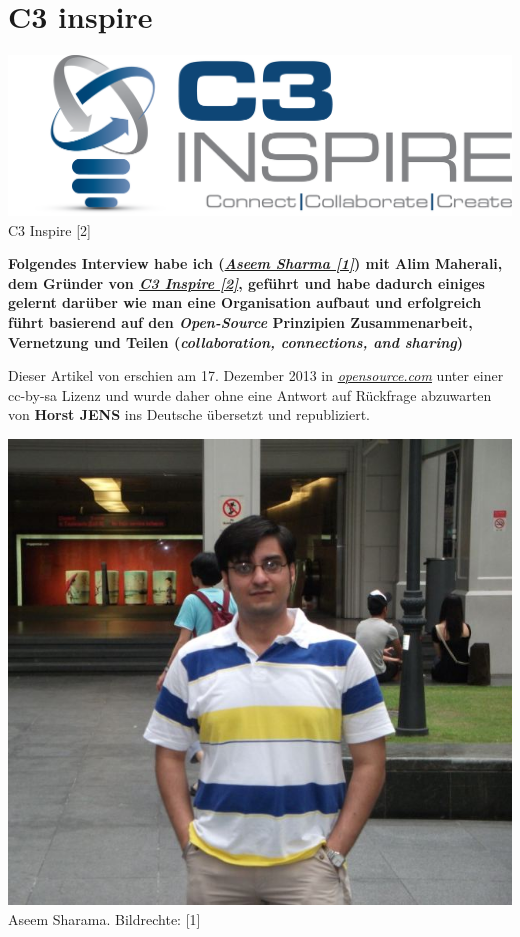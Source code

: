 \section*{C3 inspire}
\hypertarget{c3inspire}{}
\label{c3inspire}
\begin{center}
\includegraphics[width=0.8\linewidth]{c3inspire/c3inspire.png}\\
\footnotesize{C3 Inspire [2]}
\end{center}

\textbf{Folgendes Interview habe ich (\href{http://aseemsharma.info/about-me/aseemsharma/}{\textit{Aseem Sharma [1]}}) mit Alim Maherali, dem Gründer von \href{http://c3inspire.com}{\textit{C3 Inspire [2]}}, geführt und habe dadurch einiges gelernt darüber wie man eine Organisation aufbaut und erfolgreich führt basierend auf den \textit{Open-Source} Prinzipien Zusammenarbeit, Vernetzung und Teilen (\textit{collaboration, connections, and sharing})}

Dieser Artikel von  erschien am 17. Dezember 2013 in \href{http://opensource.com/education/13/12/interview-Alim-Maherali-C3-Inspire}{\textit{opensource.com}} unter einer cc-by-sa Lizenz und wurde daher ohne eine Antwort auf Rückfrage abzuwarten von  \textbf{Horst JENS} ins Deutsche übersetzt und republiziert.\\

\begin{center}
\includegraphics[width=0.7\linewidth]{c3inspire/c3inspire_aseemsharma.jpg} \\
\footnotesize{Aseem Sharama. Bildrechte: [1]}
\end{center}

